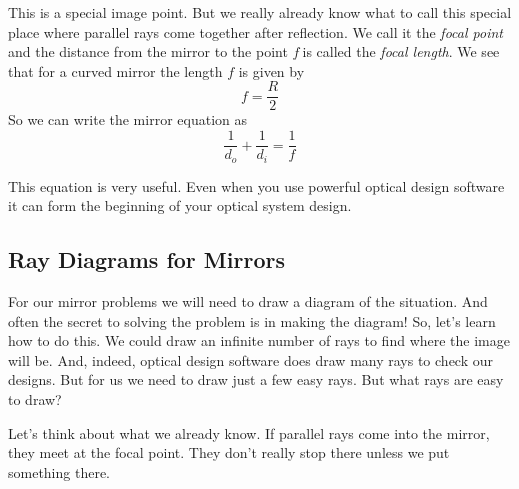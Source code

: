 \documentclass{article}
\begin{document}
This is a special image point. But we really already know what to call this
special place where parallel rays come together after reflection. We call it
the \emph{focal point} and the distance from the mirror to the point $f\ $is
called the \emph{focal length}. We see that for a curved mirror the length $%
f $ is given by 
\begin{equation}
f=\frac{R}{2}
\end{equation}%
So we can write the mirror equation as%
\begin{equation}
\frac{1}{d_{o}}+\frac{1}{d_{i}}=\frac{1}{f}
\end{equation}

This equation is very useful. Even when you use powerful optical design
software it can form the beginning of your optical system design.

\subsection{Ray Diagrams for Mirrors}

For our mirror problems we will need to draw a diagram of the situation. And
often the secret to solving the problem is in making the diagram! So, let's
learn how to do this. We could draw an infinite number of rays to find where
the image will be. And, indeed, optical design software does draw many rays
to check our designs. But for us we need to draw just a few easy rays. But
what rays are easy to draw?

Let's think about what we already know. If parallel rays come into the
mirror, they meet at the focal point. They don't really stop there unless we
put something there.
\end{document}
